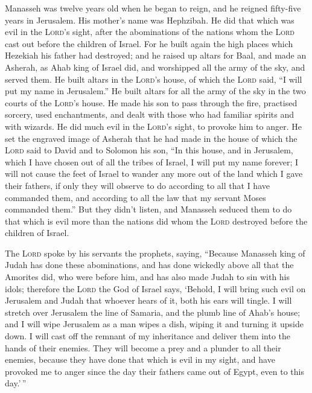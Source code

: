  Manasseh was twelve years old when he began to reign, and
he reigned fifty-five years in Jerusalem. His mother's name was
Hephzibah.  He did that which was evil in the
\textsc{Lord}'s sight, after the abominations of the nations whom the
\textsc{Lord} cast out before the children of Israel.  For
he built again the high places which Hezekiah his father had destroyed;
and he raised up altars for Baal, and made an Asherah, as Ahab king of
Israel did, and worshipped all the army of the sky, and served them.
 He built altars in the \textsc{Lord}'s house, of which
the \textsc{Lord} said, ``I will put my name in Jerusalem.''
 He built altars for all the army of the sky in the two
courts of the \textsc{Lord}'s house.  He made his son to
pass through the fire, practised sorcery, used enchantments, and dealt
with those who had familiar spirits and with wizards. He did much evil
in the \textsc{Lord}'s sight, to provoke him to anger.  He
set the engraved image of Asherah that he had made in the house of which
the \textsc{Lord} said to David and to Solomon his son, ``In this house,
and in Jerusalem, which I have chosen out of all the tribes of Israel, I
will put my name forever;  I will not cause the feet of
Israel to wander any more out of the land which I gave their fathers, if
only they will observe to do according to all that I have commanded
them, and according to all the law that my servant Moses commanded
them.''  But they didn't listen, and Manasseh seduced them
to do that which is evil more than the nations did whom the
\textsc{Lord} destroyed before the children of Israel.

 The \textsc{Lord} spoke by his servants the prophets,
saying,  ``Because Manasseh king of Judah has done these
abominations, and has done wickedly above all that the Amorites did, who
were before him, and has also made Judah to sin with his idols;
 therefore the \textsc{Lord} the God of Israel says,
`Behold, I will bring such evil on Jerusalem and Judah that whoever
hears of it, both his ears will tingle.  I will stretch
over Jerusalem the line of Samaria, and the plumb line of Ahab's house;
and I will wipe Jerusalem as a man wipes a dish, wiping it and turning
it upside down.  I will cast off the remnant of my
inheritance and deliver them into the hands of their enemies. They will
become a prey and a plunder to all their enemies, 
because they have done that which is evil in my sight, and have provoked
me to anger since the day their fathers came out of Egypt, even to this
day.'\,''

